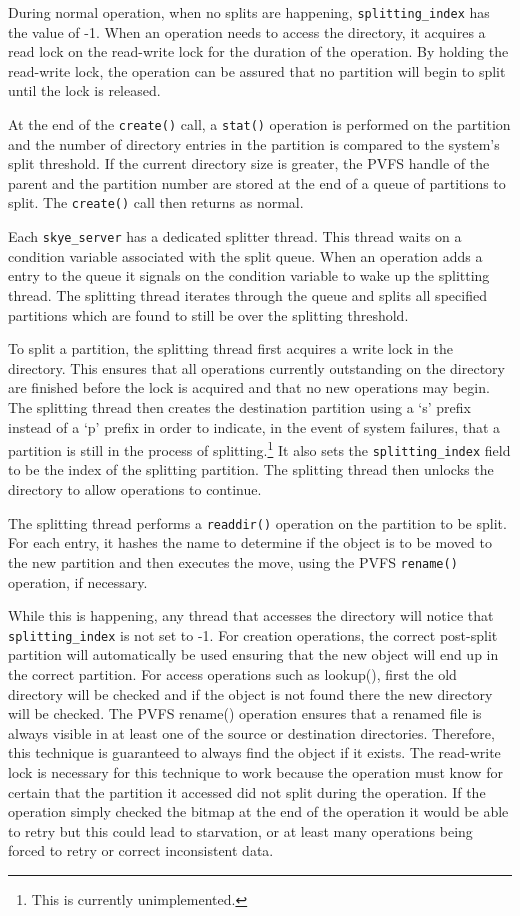 \documentclass[twocolumn,letterpaper]{article}
\newcommand{\code}[1]{\texttt{#1}}
\begin{document}
During normal operation, when no splits are happening,
\code{splitting\_\-index} has the value of -1.  When an operation needs to
access the directory, it acquires a read lock on the read-write lock for the
duration of the operation.  By holding the read-write lock, the operation can
be assured that no partition will begin to split until the lock is released.

At the end of the \code{create()} call, a \code{stat()} operation is performed
on the partition and the number of directory entries in the partition is
compared to the system's split threshold.  If the current directory size is
greater, the PVFS handle of the parent and the partition number are stored at
the end of a queue of partitions to split.  The \code{create()} call then
returns as normal.

Each \code{skye\_\-server} has a dedicated splitter thread.  This thread waits on a
condition variable associated with the split queue.  When an operation adds a
entry to the queue it signals on the condition variable to wake up the splitting
thread.  The splitting thread iterates through the queue and splits all
specified partitions which are found to still be over the splitting threshold.

To split a partition, the splitting thread first acquires a write lock in the
directory.  This ensures that all operations currently outstanding on the
directory are finished before the lock is acquired and that no new operations
may begin.  The splitting thread then creates the destination partition using a
`s' prefix instead of a `p' prefix in order to indicate, in the event of system
failures, that a partition is still in the process of splitting.\footnote{This
is currently unimplemented.}  It also sets the \code{splitting\_\-index} field
to be the index of the splitting partition.  The splitting thread then unlocks
the directory to allow operations to continue.

The splitting thread performs a \code{readdir()} operation on the partition to be
split.  For each entry, it hashes the name to determine if the object is to be
moved to the new partition and then executes the move, using the PVFS
\code{rename()} operation, if necessary.

While this is happening, any thread that accesses the directory will notice that
\code{splitting\_\-index} is not set to -1.  For creation operations, the
correct post-split partition will automatically be used ensuring that the new
object will end up in the correct partition.  For access operations such as
lookup(), first the old directory will be checked and if the object is not
found there the new directory will be checked.  The PVFS rename() operation
ensures that a renamed file is always visible in at least one of the source or
destination directories.  Therefore, this technique is guaranteed to always
find the object if it exists.  The read-write lock is necessary for this technique to
work because the operation must know for certain that the partition it
accessed did not split during the operation.  If the operation simply checked
the bitmap at the end of the operation it would be able to retry but this
could lead to starvation, or at least many operations being forced to retry or
correct inconsistent data.
\end{document}
